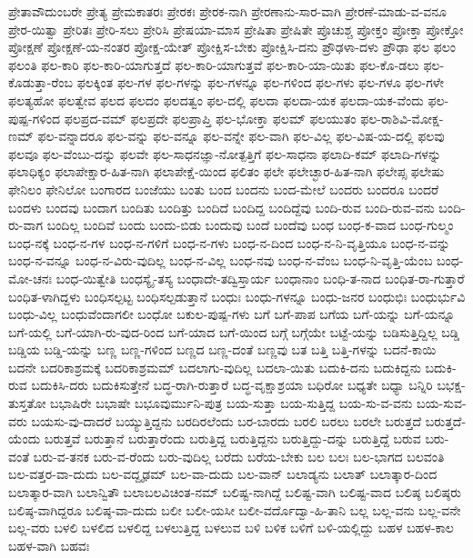 {ಪ್ರೇತಾವೌದುಂಬರೇ
ಪ್ರೇತ್ಯ
ಪ್ರೇಮಕಾತರಃ
ಪ್ರೇರಕಃ
ಪ್ರೇರಕ-ನಾಗಿ
ಪ್ರೇರಣಾನು-ಸಾರ-ವಾಗಿ
ಪ್ರೇರಣೆ-ಮಾಡು-ವ-ವನೂ
ಪ್ರೇರ-ಯಿತ್ವಾ
ಪ್ರೇರಿತಃ
ಪ್ರೇರಿ-ಸಲು
ಪ್ರೇರಿಸಿ
ಪ್ರೇಷಯಾ-ಮಾಸ
ಪ್ರೇಷಿತಾ
ಪ್ರೇಷಿತೇ
ಪ್ರೊಚುಶ್ಚ
ಪ್ರೋಕ್ತಂ
ಪ್ರೋಕ್ತಾ
ಪ್ರೋಕ್ತೋ
ಪ್ರೋಕ್ಷಣೆ
ಪ್ರೋಕ್ಷಣೆ-ಯ-ನಂತರ
ಪ್ರೋಕ್ಷ-ಯೇತ್
ಪ್ರೋಕ್ಷಿಸ-ಬೇಕು
ಪ್ರೋಕ್ಷಿಸಿ-ದನು
ಪ್ರೌಢಳಾ-ದಳು
ಪ್ರೌಢಾ
ಫಲ
ಫಲಂ
ಫಲಂತಿ
ಫಲ-ಕಾರಿ
ಫಲ-ಕಾರಿ-ಯಾಗುತ್ತದೆ
ಫಲ-ಕಾರಿ-ಯಾಗುತ್ತವೆ
ಫಲ-ಕಾರಿ-ಯಾ-ಯಿತು
ಫಲ-ಕೊ-ಡಲು
ಫಲ-ಕೊಡುತ್ತಾ-ರೆಂಬ
ಫಲಕ್ಕಿಂತ
ಫಲ-ಗಳ
ಫಲ-ಗಳನ್ನು
ಫಲ-ಗಳನ್ನೂ
ಫಲ-ಗಳಿಂದ
ಫಲ-ಗಳು
ಫಲ-ಗಳೂ
ಫಲ-ಗಳೇ
ಫಲತ್ಯಹೋ
ಫಲತ್ವೇವ
ಫಲದ
ಫಲದಂ
ಫಲದತ್ವಂ
ಫಲ-ದಲ್ಲಿ
ಫಲದಾ
ಫಲದಾ-ಯಕ
ಫಲದಾ-ಯಕ-ವೆಂದು
ಫಲ-ಪುಷ್ಪ-ಗಳಿಂದ
ಫಲಪ್ರದ-ವಮ್
ಫಲಪ್ರದೇ
ಫಲಪ್ರಾಪ್ತಿ
ಫಲ-ಭೋಕ್ತಾ
ಫಲಮ್
ಫಲಯುತಂ
ಫಲ-ರಾಶಿವಿ-ಮೋಕ್ಷ-ಣಮ್
ಫಲ-ವನ್ನಾದರೂ
ಫಲ-ವನ್ನು
ಫಲ-ವನ್ನೂ
ಫಲ-ವನ್ನೇ
ಫಲ-ವಾಗಿ
ಫಲ-ವಿಲ್ಲ
ಫಲ-ವಿಷ-ಯ-ದಲ್ಲಿ
ಫಲವು
ಫಲವೂ
ಫಲ-ವೆಂಬು-ದನ್ನು
ಫಲವೇ
ಫಲ-ಸಾಧನಜ್ಞಾ-ನೋತ್ಪತ್ತಿಗೆ
ಫಲ-ಸಾಧನಾ
ಫಲಾದಿ-ಕಮ್
ಫಲಾದಿ-ಗಳನ್ನು
ಫಲಾಧಿಕ್ಯಂ
ಫಲಾಪೇಕ್ಷಾರ-ಹಿತ-ನಾಗಿ
ಫಲಾಪೇಕ್ಷೆ-ಯಿಂದ
ಫಲಿತಂ
ಫಲೇ
ಫಲೇಚ್ಛಾರ-ಹಿತ-ನಾಗಿ
ಫಲೇಪ್ಸ
ಫಲೇಷು
ಫೇನಿಲಂ
ಫೇನಿಲೋ
ಬಂಗಾರದ
ಬಂಜೆಯು
ಬಂತು
ಬಂದ
ಬಂದನು
ಬಂದ-ಮೇಲೆ
ಬಂದರು
ಬಂದರೂ
ಬಂದರೆ
ಬಂದಳು
ಬಂದವು
ಬಂದಾಗ
ಬಂದಿತು
ಬಂದಿತ್ತು
ಬಂದಿದೆ
ಬಂದಿದ್ದ
ಬಂದಿದ್ದೆವು
ಬಂದಿ-ರುವ
ಬಂದಿ-ರುವ-ವನು
ಬಂದಿ-ರು-ವಾಗ
ಬಂದಿಲ್ಲ
ಬಂದಿವೆ
ಬಂದು
ಬಂದು-ಬಿಡು
ಬಂದುವು
ಬಂದೆ
ಬಂದೆವು
ಬಂಧ
ಬಂಧ-ಕ-ವಾದ
ಬಂಧ-ಗುಲ್ಮಂ
ಬಂಧ-ನಕ್ಕೆ
ಬಂಧ-ನ-ಗಳ
ಬಂಧ-ನ-ಗಳಿಗೆ
ಬಂಧ-ನ-ಗಳು
ಬಂಧ-ನ-ದಿಂದ
ಬಂಧ-ನ-ನಿ-ವೃತ್ತಿಯೂ
ಬಂಧ-ನ-ವನ್ನು
ಬಂಧ-ನ-ವನ್ನೂ
ಬಂಧ-ನ-ವಿರು-ವುದಿಲ್ಲ
ಬಂಧ-ನ-ವಿಲ್ಲ
ಬಂಧ-ನವು
ಬಂಧ-ನ-ವೆಂಬ
ಬಂಧ-ನಿ-ವೃತ್ತಿ-ಯೆಂಬ
ಬಂಧ-ಮೋ-ಚನಃ
ಬಂಧ-ಯಿತ್ವೇತಿ
ಬಂಧಸ್ಯೈ-ತಸ್ಯ
ಬಂಧಾದೇ-ತದ್ವಿಸ್ತಾರ್ಯ
ಬಂಧಾನಾಂ
ಬಂಧಿ-ತ-ನಾದ
ಬಂಧಿತ-ರಾ-ಗುತ್ತಾರೆ
ಬಂಧಿತ-ಳಾಗಿದ್ದಳು
ಬಂಧಿಸಲ್ಪಟ್ಟ
ಬಂಧಿಸಲ್ಪಡುತ್ತಾನೆ
ಬಂಧುಃ
ಬಂಧು-ಗಳನ್ನೂ
ಬಂಧು-ಜನರ
ಬಂಧುಭಿಃ
ಬಂಧುರ್ಭುವಿ
ಬಂಧು-ವಿಲ್ಲ
ಬಂಧುವೆಂದಾಗಲೀ
ಬಂಧೋ
ಬಕುಲ-ಪುಷ್ಪ-ಗಳು
ಬಗೆ
ಬಗೆ-ಪಾಪ
ಬಗೆಯ
ಬಗೆ-ಯನ್ನು
ಬಗೆ-ಯನ್ನೂ
ಬಗೆ-ಯಲ್ಲಿ
ಬಗೆ-ಯಾಗಿ-ರು-ವುದ-ರಿಂದ
ಬಗೆ-ಯಾದ
ಬಗೆ-ಯಿಂದ
ಬಗ್ಗೆ
ಬಗ್ಗೆಯೇ
ಬಟ್ಟೆ-ಯನ್ನು
ಬಡಿಸುತ್ತಿದ್ದಿಲ್ಲ
ಬಡ್ಡಿ
ಬಡ್ಡಿಯ
ಬಡ್ಡಿ-ಯನ್ನು
ಬಣ್ಣ
ಬಣ್ಣ-ಗಳಿಂದ
ಬಣ್ಣದ
ಬಣ್ಣ-ದಂತೆ
ಬಣ್ಣವು
ಬತ
ಬತ್ತಿ
ಬತ್ತಿ-ಗಳನ್ನು
ಬದನೆ-ಕಾಯಿ
ಬದನೇ
ಬದರಿಕಾಶ್ರಮಕ್ಕೆ
ಬದರಿಕಾಶ್ರಮಮ್
ಬದಲಾಗು-ವುದಿಲ್ಲ
ಬದಲಾ-ಯಿತು
ಬದುಕಿ-ದನು
ಬದುಕಿದ್ದನು
ಬದುಕಿ-ರುವ
ಬದುಕಿಸಿ-ದರು
ಬದುಕಿಸುತ್ತೇನೆ
ಬದ್ಧ-ರಾಗಿ-ರುತ್ತಾರೆ
ಬದ್ಧ-ವೃಕ್ಷಾಶ್ರಯಾ
ಬಧಿರೋ
ಬಧ್ಯತೇ
ಬಧ್ಯಾ
ಬನ್ನಿರಿ
ಬಭಕ್ಷ-ತುಸ್ತತೋ
ಬಭಾಷಿರೇ
ಬಭಾಷೇ
ಬಭೂವುರ್ಮುನಿ-ಪುತ್ರ
ಬಯ-ಸುತ್ತಾ
ಬಯ-ಸುತ್ತಿದ್ದ
ಬಯ-ಸು-ವ-ವನು
ಬಯ-ಸುವ-ವರು
ಬಯಸು-ವು-ದಾದರೆ
ಬಯ್ಯುತ್ತಿದ್ದನು
ಬರದಿರಲೆಂದು
ಬರ-ಬಾರದು
ಬರಲಿ
ಬರಲು
ಬರಲೇ
ಬರುತ್ತದೆ
ಬರುತ್ತದೆ-ಯೆಂದು
ಬರುತ್ತವೆ
ಬರುತ್ತಾನೆ
ಬರುತ್ತಾರೆಂದು
ಬರುತ್ತಿದ್ದ
ಬರುತ್ತಿದ್ದನು
ಬರುತ್ತಿದ್ದು-ದನ್ನು
ಬರುತ್ತಿದ್ದೆ
ಬರುವ
ಬರು-ವಂತೆ
ಬರು-ವ-ತನಕ
ಬರು-ವ-ರೆಂದು
ಬರು-ವುದಿಲ್ಲ
ಬರೆದು
ಬರೆಯ-ಬೇಕು
ಬಲ
ಬಲಃ
ಬಲ-ಭಾಗದ
ಬಲವಂತಿ
ಬಲ-ವತ್ತರ-ವಾ-ದುದು
ಬಲ-ವದ್ದೃಢಮ್
ಬಲ-ವಾ-ದುದು
ಬಲ-ವಾನ್
ಬಲಾಡ್ಯನು
ಬಲಾತ್
ಬಲಾತ್ಕಾರ-ದಿಂದ
ಬಲಾತ್ಕಾರ-ವಾಗಿ
ಬಲಾನ್ವಿತೌ
ಬಲಾಬಲವಿಚಿಂತ-ನಮ್
ಬಲಿಷ್ಟ-ನಾಗಿದ್ದೆ
ಬಲಿಷ್ಟ-ವಾಗಿ
ಬಲಿಷ್ಟ-ವಾದ
ಬಲಿಷ್ಠ
ಬಲಿಷ್ಠರು
ಬಲಿಷ್ಠ-ವಾಗಿದ್ದರೂ
ಬಲಿಷ್ಠ-ವಾ-ದುದು
ಬಲೀ
ಬಲೀ-ಯಸೀ
ಬಲೀ-ವರ್ದೊದ್ವಾ-ಹಿ-ತಾನಿ
ಬಲ್ಲ
ಬಲ್ಲ-ವನು
ಬಲ್ಲ-ವನೇ
ಬಲ್ಲ-ವರು
ಬಳಲಿ
ಬಳಲಿದ
ಬಳಲಿದ್ದ
ಬಳಲುತ್ತಿದ್ದ
ಬಳಲುವ
ಬಳಿ
ಬಳಿಕ
ಬಳಿಗೆ
ಬಳಿ-ಯಲ್ಲಿದ್ದು
ಬಹಳ
ಬಹಳ-ಕಾಲ
ಬಹಳ-ವಾಗಿ
ಬಹವಃ
}
